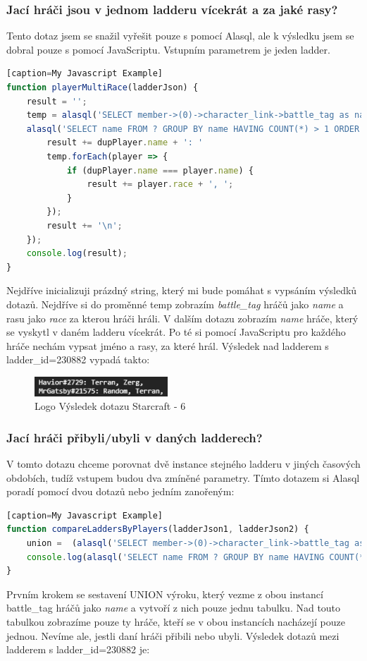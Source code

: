 \documentclass[a4, titlepage]{article}
\begin{document}
\subsubsection{Jací hráči jsou v jednom ladderu vícekrát a za jaké rasy?}
Tento dotaz jsem se snažil vyřešit pouze s pomocí Alasql, ale k výsledku jsem se dobral pouze s pomocí JavaScriptu. Vstupním parametrem je jeden ladder.
\begin{lstlisting}[language=JavaScript][caption=My Javascript Example]
function playerMultiRace(ladderJson) {
    result = '';
    temp = alasql('SELECT member->(0)->character_link->battle_tag as name, member->(0)->played_race_count->(0)->race as race FROM ?', [ladderJson.team]);
    alasql('SELECT name FROM ? GROUP BY name HAVING COUNT(*) > 1 ORDER BY name', [temp]).forEach(dupPlayer => {
        result += dupPlayer.name + ': '
        temp.forEach(player => {
            if (dupPlayer.name === player.name) {
                result += player.race + ', ';
            }
        });
        result += '\n';
    });
    console.log(result);
}
\end{lstlisting}
Nejdříve inicializuji prázdný string, který mi bude pomáhat s vypsáním výsledků dotazů. Nejdříve si do proměnné temp zobrazím \textit{battle\_tag} hráčů jako \textit{name} a rasu jako \textit{race} za kterou hráči hráli. V dalším dotazu zobrazím \textit{name} hráče, který se vyskytl v daném ladderu vícekrát. Po té si pomocí JavaScriptu pro každého hráče nechám vypsat jméno a rasy, za které hrál. Výsledek nad ladderem s ladder\_id=230882 vypadá takto:
\begin{figure}[h]
    \centering
    \includegraphics[width=5cm]{S6}
    \caption{Logo Výsledek dotazu Starcraft - 6}
\end{figure} 

\subsubsection{Jací hráči přibyli/ubyli v daných ladderech?}
V tomto dotazu chceme porovnat dvě instance stejného ladderu v jiných časových obdobích, tudíž vstupem budou dva zmíněné parametry. Tímto dotazem si Alasql poradí pomocí dvou dotazů nebo jedním zanořeným: 
\begin{lstlisting}[language=JavaScript][caption=My Javascript Example]
function compareLaddersByPlayers(ladderJson1, ladderJson2) {
    union =  (alasql('SELECT member->(0)->character_link->battle_tag as name FROM ? UNION ALL SELECT member->(0)->character_link->battle_tag as name FROM ?', [ladderJson1.team, ladderJson2.team]));
    console.log(alasql('SELECT name FROM ? GROUP BY name HAVING COUNT(*)=1',[union]));
}
\end{lstlisting}
Prvním krokem se sestavení UNION výroku, který vezme z obou instancí battle\_tag hráčů jako \textit{name} a vytvoří z nich pouze jednu tabulku. Nad touto tabulkou zobrazíme pouze ty hráče, kteří se v obou instancích nacházejí pouze jednou. Nevíme ale, jestli daní hráči přibili nebo ubyli. Výsledek dotazů mezi ladderem s ladder\_id=230882 je:
\end{document}
